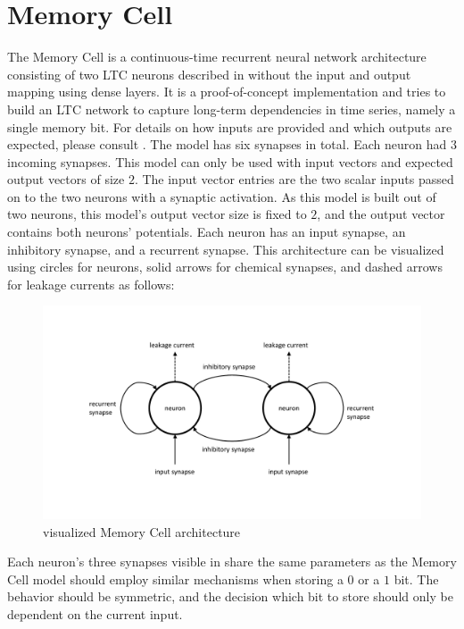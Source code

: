 \documentclass[draft,final]{vutinfth} %
\begin{document}
    \section{Memory Cell} \label{memory_cell}
    The Memory Cell is a continuous-time recurrent neural network architecture consisting of two LTC neurons described in  without the input and output mapping using dense layers.
    It is a proof-of-concept implementation and tries to build an LTC network \cite{LTCNetworks} to capture long-term dependencies in time series, namely a single memory bit.
    For details on how inputs are provided and which outputs are expected, please consult .
    The model has six synapses in total. Each neuron had $3$ incoming synapses.
    This model can only be used with input vectors and expected output vectors of size $2$.
    The input vector entries are the two scalar inputs passed on to the two neurons with a synaptic activation.
    As this model is built out of two neurons, this model's output vector size is fixed to $2$, and the output vector contains both neurons' potentials.
    Each neuron has an input synapse, an inhibitory synapse, and a recurrent synapse.
    This architecture can be visualized using circles for neurons, solid arrows for chemical synapses, and dashed arrows for leakage currents as follows:
    \begin{figure}[H]
        \centering{}
        \includegraphics[width=\linewidth]{graphics/memory_cell.pdf}
        \caption{visualized Memory Cell architecture}
        \label{fig:memory_cell_vis}
    \end{figure}
    Each neuron's three synapses visible in  share the same parameters as the Memory Cell model should employ similar mechanisms when storing a $0$ or a $1$ bit.
    The behavior should be symmetric, and the decision which bit to store should only be dependent on the current input.
\end{document}
